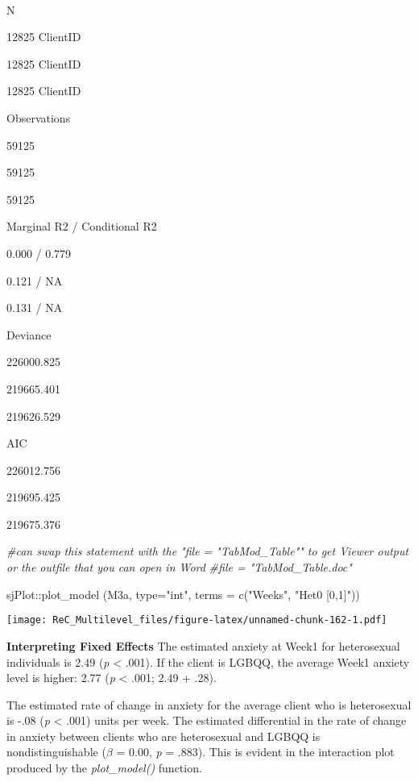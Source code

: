 \documentclass[
  11pt,
]{book}
\newenvironment{Shaded}{\begin{snugshade}}{\end{snugshade}}
\newcommand{\AttributeTok}[1]{\textcolor[rgb]{0.77,0.63,0.00}{#1}}
\newcommand{\CommentTok}[1]{\textcolor[rgb]{0.56,0.35,0.01}{\textit{#1}}}
\newcommand{\FunctionTok}[1]{\textcolor[rgb]{0.00,0.00,0.00}{#1}}
\newcommand{\NormalTok}[1]{#1}
\newcommand{\SpecialCharTok}[1]{\textcolor[rgb]{0.00,0.00,0.00}{#1}}
\newcommand{\StringTok}[1]{\textcolor[rgb]{0.31,0.60,0.02}{#1}}
\begin{document}
~

N

12825 ClientID

12825 ClientID

12825 ClientID

Observations

59125

59125

59125

Marginal R2 / Conditional R2

0.000 / 0.779

0.121 / NA

0.131 / NA

Deviance

226000.825

219665.401

219626.529

AIC

226012.756

219695.425

219675.376

\begin{Shaded}
\begin{Highlighting}[]
\CommentTok{\#can swap this statement with the "file = "TabMod\_Table"" to get Viewer output or the outfile that you can open in Word}
\CommentTok{\#file = "TabMod\_Table.doc"}
\end{Highlighting}
\end{Shaded}

\begin{Shaded}
\begin{Highlighting}[]
\NormalTok{sjPlot}\SpecialCharTok{::}\FunctionTok{plot\_model}\NormalTok{ (M3a, }\AttributeTok{type=}\StringTok{"int"}\NormalTok{, }\AttributeTok{terms =} \FunctionTok{c}\NormalTok{(}\StringTok{"Weeks"}\NormalTok{, }\StringTok{"Het0 [0,1]"}\NormalTok{))}
\end{Highlighting}
\end{Shaded}

\texttt{[image: ReC\_Multilevel\_files/figure-latex/unnamed-chunk-162-1.pdf]}

\textbf{Interpreting Fixed Effects}
The estimated anxiety at Week1 for heterosexual individuals is 2.49 (\emph{p} \textless{} .001). If the client is LGBQQ, the average Week1 anxiety level is higher: 2.77 (\emph{p} \textless{} .001; 2.49 + .28).

The estimated rate of change in anxiety for the average client who is heterosexual is -.08 (\emph{p} \textless{} .001) units per week. The estimated differential in the rate of change in anxiety between clients who are heterosexual and LGBQQ is nondistinguishable (\(\beta\) = 0.00, \emph{p} = .883). This is evident in the interaction plot produced by the \emph{plot\_model()} function.
\end{document}
